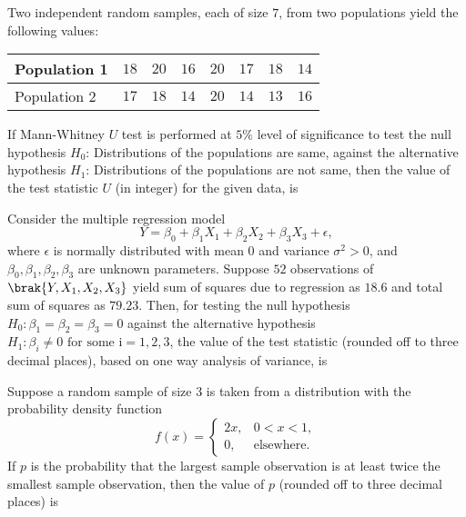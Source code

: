     \item Two independent random samples, each of size $7$, from two populations yield the following values:
        \begin{table}[!ht]
            \centering
            \begin{tabular}{|l|c|c|c|c|c|c|c|}
\hline
Population 1 & $18$ & $20$ & $16$ & $20$ & $17$ & $18$ & $14$ \\
\hline
Population 2 & $17$ & $18$ & $14$ & $20$ & $14$ & $13$ & $16$ \\
\hline
\end{tabular}
        \end{table}
        If Mann-Whitney $U$ test is performed at $5\%$ level of significance to test the null hypothesis $H_0$: Distributions of the populations are same, against the alternative hypothesis $H_1$: Distributions of the populations are not same, then the value of the test statistic $U$ (in integer) for the given data, is \underline{\hspace{1cm}}

    \item Consider the multiple regression model $$Y=\beta_0+\beta_1X_1+\beta_2X_2+\beta_3X_3+\epsilon,$$ where $\epsilon$ is normally distributed with mean $0$ and variance $\sigma^2 > 0$, and $\beta_0 , \beta_1, \beta_2, \beta_3$ are unknown parameters. Suppose $52$ observations of $\brak{Y, X_1, X_2, X_3}$ yield sum of squares due to regression as $18.6$ and total sum of squares as $79.23$. Then, for testing the null hypothesis $H_0 : \beta_1 = \beta_2 = \beta_3 = 0$ against the alternative hypothesis $H_1: \beta_{i} \neq 0 \text{ for some i} = 1, 2, 3$, the value of the test statistic (rounded off to three decimal places), based on one way analysis of variance, is \underline{\hspace{1cm}}

    \item Suppose a random sample of size $3$ is taken from a distribution with the probability density function $$f(x)=
        \begin{cases}
            2x, & 0<x<1,\\
            0, & \text{elsewhere.}
        \end{cases}$$
        If $p$ is the probability that the largest sample observation is at least twice the smallest sample observation, then the value of $p$ (rounded off to three decimal places) is \underline{\hspace{1cm}}

